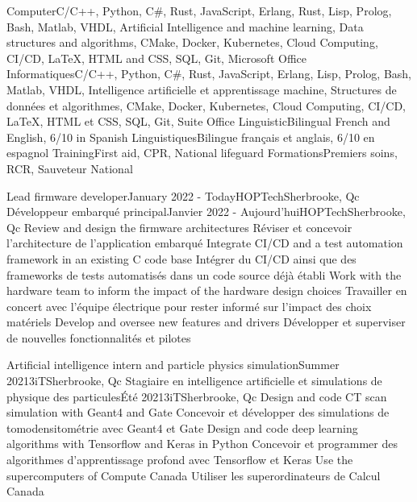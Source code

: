     \resumeEnumerationStart
        \resumeEnumerationEnFr
            {Computer}{C/C++, Python, C\#, Rust, JavaScript, Erlang, Rust, Lisp, Prolog, Bash, Matlab, VHDL, Artificial Intelligence and machine learning, Data structures and algorithms, CMake, Docker, Kubernetes, Cloud Computing, CI/CD, LaTeX, HTML and CSS, SQL, Git, Microsoft Office}
            {Informatiques}{C/C++, Python, C\#, Rust, JavaScript, Erlang, Lisp, Prolog, Bash, Matlab, VHDL, Intelligence artificielle et apprentissage machine, Structures de données et algorithmes, CMake, Docker, Kubernetes, Cloud Computing, CI/CD, LaTeX, HTML et CSS, SQL, Git, Suite Office}
        \resumeEnumerationEnFr
            {Linguistic}{Bilingual French and English, 6/10 in Spanish}
            {Linguistiques}{Bilingue français et anglais, 6/10 en espagnol}
        \resumeEnumerationEnFr
            {Training}{First aid, CPR, National lifeguard}
            {Formations}{Premiers soins, RCR, Sauveteur National}
    \resumeEnumerationEnd


  \resumeSubHeadingListStart
      \resumeSubheadingEnFr
        {Lead firmware developer}{January 2022 - Today}{HOPTech}{Sherbrooke, Qc}
        {Développeur embarqué principal}{Janvier 2022 - Aujourd'hui}{HOPTech}{Sherbrooke, Qc}
            \resumeItemListStart
                \resumeItemEnFr
                    {Review and design the firmware architectures}
                    {Réviser et concevoir l'architecture de l'application embarqué}
                \resumeItemEnFr
                    {Integrate CI/CD and a test automation framework in an existing C code base}
                    {Intégrer du CI/CD ainsi que des frameworks de tests automatisés dans un code source déjà établi}
                \resumeItemEnFr
                    {Work with the hardware team to inform the impact of the hardware design choices}
                    {Travailler en concert avec l'équipe électrique pour rester informé sur l'impact des choix matériels}
                \resumeItemEnFr
                    {Develop and oversee new features and drivers}
                    {Développer et superviser de nouvelles fonctionnalités et pilotes}
            \resumeItemListEnd
  
    \resumeSubheadingEnFr
        {Artificial intelligence intern and particle physics simulation}{Summer 2021}{3iT}{Sherbrooke, Qc}
        {Stagiaire en intelligence artificielle et simulations de physique des particules}{Été 2021}{3iT}{Sherbrooke, Qc}
            \resumeItemListStart
                \resumeItemEnFr
                    {Design and code CT scan simulation with Geant4 and Gate}
                    {Concevoir et développer des simulations de tomodensitométrie avec Geant4 et Gate}
                \resumeItemEnFr
                    {Design and code deep learning algorithms with Tensorflow and Keras in Python}
                    {Concevoir et programmer des algorithmes d’apprentissage profond avec Tensorflow et Keras}
                \resumeItem
                    {Use the supercomputers of Compute Canada}
                    {Utiliser les superordinateurs de Calcul Canada}
            \resumeItemListEnd

